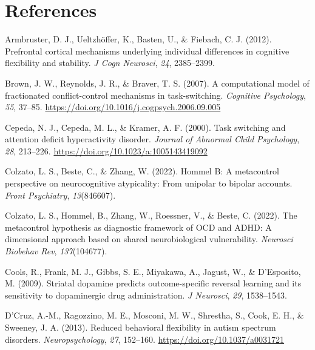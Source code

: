 \documentclass[
  english,
  man,floatsintext]{apa6}
\newlength{\cslhangindent}
\newenvironment{CSLReferences}[2] %
 {\begin{list}{}{%
  \setlength{\itemindent}{0pt}
  \setlength{\leftmargin}{0pt}
  \setlength{\parsep}{0pt}
  \ifodd #1
   \setlength{\leftmargin}{\cslhangindent}
   \setlength{\itemindent}{-1\cslhangindent}
  \fi
  \setlength{\itemsep}{#2\baselineskip}}}
 {\end{list}}
\begin{document}
\section{References}\label{references}

\label{refs}
\begin{CSLReferences}{1}{0}
Armbruster, D. J., Ueltzhöffer, K., Basten, U., \& Fiebach, C. J. (2012). Prefrontal cortical mechanisms underlying individual differences in cognitive flexibility and stability. \emph{J Cogn Neurosci}, \emph{24}, 2385--2399.

Brown, J. W., Reynolds, J. R., \& Braver, T. S. (2007). A computational model of fractionated conflict-control mechanisms in task-switching. \emph{Cognitive Psychology}, \emph{55}, 37--85. \url{https://doi.org/10.1016/j.cogpsych.2006.09.005}

Cepeda, N. J., Cepeda, M. L., \& Kramer, A. F. (2000). Task switching and attention deficit hyperactivity disorder. \emph{Journal of Abnormal Child Psychology}, \emph{28}, 213--226. \url{https://doi.org/10.1023/a:1005143419092}

Colzato, L. S., Beste, C., \& Zhang, W. (2022). Hommel {B}: {A} metacontrol perspective on neurocognitive atypicality: From unipolar to bipolar accounts. \emph{Front Psychiatry}, \emph{13}(846607).

Colzato, L. S., Hommel, B., Zhang, W., Roessner, V., \& Beste, C. (2022). The metacontrol hypothesis as diagnostic framework of {OCD} and {ADHD}: A dimensional approach based on shared neurobiological vulnerability. \emph{Neurosci Biobehav Rev}, \emph{137}(104677).

Cools, R., Frank, M. J., Gibbs, S. E., Miyakawa, A., Jagust, W., \& D'Esposito, M. (2009). Striatal dopamine predicts outcome-specific reversal learning and its sensitivity to dopaminergic drug administration. \emph{J Neurosci}, \emph{29}, 1538--1543.

D'Cruz, A.-M., Ragozzino, M. E., Mosconi, M. W., Shrestha, S., Cook, E. H., \& Sweeney, J. A. (2013). Reduced behavioral flexibility in autism spectrum disorders. \emph{Neuropsychology}, \emph{27}, 152--160. \url{https://doi.org/10.1037/a0031721}


\end{CSLReferences}
\end{document}
